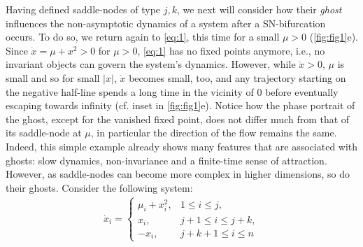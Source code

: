 \documentclass{article}
\theoremstyle{definition}
\begin{document}
\begin{refsection}
Having defined saddle-nodes of type $j,k$, we next will consider how their \emph{ghost} influences the non-asymptotic dynamics of a system after a SN-bifurcation occurs. To do so, we return again to \autoref{eq:1}, this time for a small $\mu>0$ (\autoref{fig:fig1}e). Since $\dot x=\mu+x^2>0$ for $\mu>0$, \autoref{eq:1} has no fixed points anymore, i.e., no invariant objects can govern the system's dynamics. However, while $\dot{x}>0$, $\mu$ is small and so for small $|x|$, $\dot x$ becomes small, too, and any trajectory starting on the negative half-line spends a long time in the vicinity of 0 before eventually escaping towards infinity (cf. inset in \autoref{fig:fig1}e). Notice how the phase portrait of the ghost, except for the vanished fixed point, does not differ much from that of its saddle-node at $\mu$, in particular the direction of the flow remains the same. Indeed, this simple example already shows many features that are associated with ghosts: slow dynamics, non-invariance and a finite-time sense of attraction. However, as saddle-nodes can become more complex in higher dimensions, so do their ghosts. Consider the following system:
\begin{align}
\dot{x}_i = \label{eq:2}
\begin{cases}
\mu_i + x_i^2, & 1 \le i \le j, \\[6pt]
x_i, & j+1 \le i \le j+k, \\[6pt]
-x_i, & j+k+1 \le i \le n
\end{cases}
\end{align}


\end{refsection}
\end{document}
